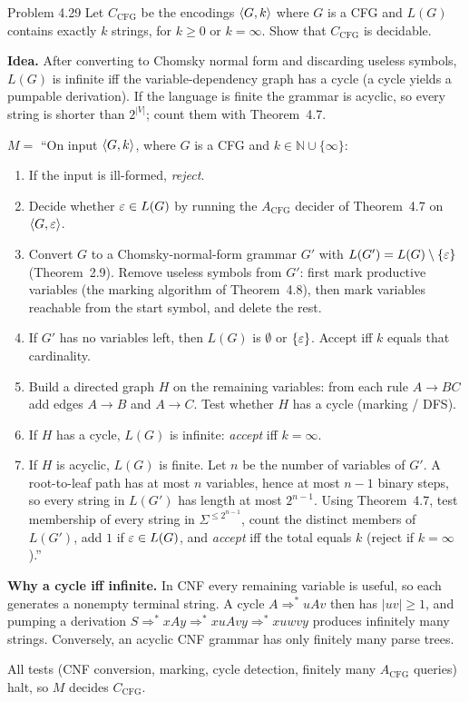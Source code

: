 \begin{question}{Problem 4.29}
Let $C_{\mathrm{CFG}}$ be the encodings $\langle G,k\rangle$ where $G$ is a CFG and $L(G)$ contains exactly $k$ strings, for $k\ge 0$ or $k=\infty$. Show that $C_{\mathrm{CFG}}$ is decidable.
\end{question}
\begin{soln}
\textbf{Idea.} After converting to Chomsky normal form and discarding useless symbols, $L(G)$ is infinite iff the variable-dependency graph has a cycle (a cycle yields a pumpable derivation). If the language is finite the grammar is acyclic, so every string is shorter than $2^{|V|}$; count them with Theorem~4.7.

$M=$ ``On input $\langle G,k\rangle$, where $G$ is a CFG and $k\in\mathbb{N}\cup\{\infty\}$:
\begin{enumerate}
\item If the input is ill-formed, \emph{reject}.
\item Decide whether $\varepsilon\in L(G)$ by running the $A_{\mathrm{CFG}}$ decider of Theorem~4.7 on $\langle G,\varepsilon\rangle$.
\item Convert $G$ to a Chomsky-normal-form grammar $G'$ with $L(G')=L(G)\setminus\{\varepsilon\}$ (Theorem~2.9). Remove useless symbols from $G'$: first mark productive variables (the marking algorithm of Theorem~4.8), then mark variables reachable from the start symbol, and delete the rest.
\item If $G'$ has no variables left, then $L(G)$ is $\emptyset$ or $\{\varepsilon\}$. Accept iff $k$ equals that cardinality.
\item Build a directed graph $H$ on the remaining variables: from each rule $A\to BC$ add edges $A\to B$ and $A\to C$. Test whether $H$ has a cycle (marking / DFS).
\item If $H$ has a cycle, $L(G)$ is infinite: \emph{accept} iff $k=\infty$.
\item If $H$ is acyclic, $L(G)$ is finite. Let $n$ be the number of variables of $G'$. A root-to-leaf path has at most $n$ variables, hence at most $n-1$ binary steps, so every string in $L(G')$ has length at most $2^{n-1}$. Using Theorem~4.7, test membership of every string in $\Sigma^{\le 2^{n-1}}$, count the distinct members of $L(G')$, add $1$ if $\varepsilon\in L(G)$, and \emph{accept} iff the total equals $k$ (reject if $k=\infty$).''
\end{enumerate}

\textbf{Why a cycle iff infinite.} In CNF every remaining variable is useful, so each generates a nonempty terminal string. A cycle $A\Rightarrow^* uAv$ then has $|uv|\ge 1$, and pumping a derivation $S\Rightarrow^* xAy\Rightarrow^* xuAvy\Rightarrow^* xuwvy$ produces infinitely many strings. Conversely, an acyclic CNF grammar has only finitely many parse trees.

All tests (CNF conversion, marking, cycle detection, finitely many $A_{\mathrm{CFG}}$ queries) halt, so $M$ decides $C_{\mathrm{CFG}}$.
\end{soln}

